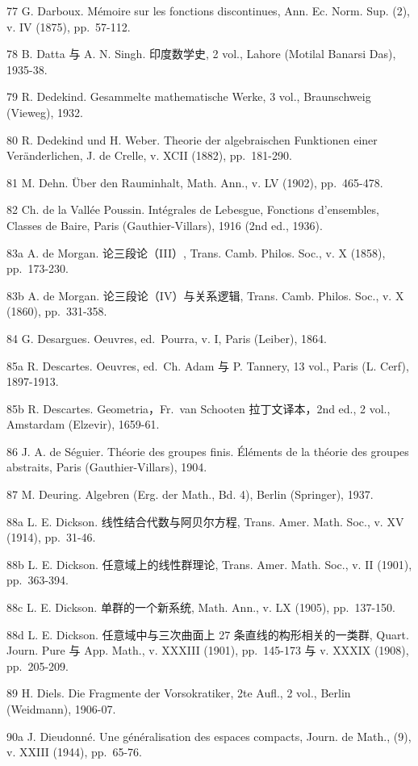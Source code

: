 77 G. Darboux. Mémoire sur les fonctions discontinues, Ann. Ec. Norm. Sup. (2), v. IV (1875), pp.~57-112.

78 B. Datta 与 A. N. Singh. 印度数学史, 2 vol., Lahore (Motilal Banarsi Das), 1935-38.

79 R. Dedekind. Gesammelte mathematische Werke, 3 vol., Braunschweig (Vieweg), 1932.

80 R. Dedekind und H. Weber. Theorie der algebraischen Funktionen einer Veränderlichen, J. de Crelle, v. XCII (1882), pp.~181-290.

81 M. Dehn. Über den Rauminhalt, Math. Ann., v. LV (1902), pp.~465-478.

82 Ch. de la Vallée Poussin. Intégrales de Lebesgue, Fonctions d'ensembles, Classes de Baire, Paris (Gauthier-Villars), 1916 (2nd ed., 1936).

83a A. de Morgan. 论三段论（III）, Trans. Camb. Philos. Soc., v. X (1858), pp.~173-230.

83b A. de Morgan. 论三段论（IV）与关系逻辑, Trans. Camb. Philos. Soc., v. X (1860), pp.~331-358.

84 G. Desargues. Oeuvres, ed.~Pourra, v. I, Paris (Leiber), 1864.

85a R. Descartes. Oeuvres, ed.~Ch. Adam 与 P. Tannery, 13 vol., Paris (L. Cerf), 1897-1913.

85b R. Descartes. Geometria，Fr.~van Schooten 拉丁文译本，2nd ed., 2 vol., Amstardam (Elzevir), 1659-61.

86 J. A. de Séguier. Théorie des groupes finis. Éléments de la théorie des groupes abstraits, Paris (Gauthier-Villars), 1904.

87 M. Deuring. Algebren (Erg. der Math., Bd. 4), Berlin (Springer), 1937.

88a L. E. Dickson. 线性结合代数与阿贝尔方程, Trans. Amer. Math. Soc., v. XV (1914), pp.~31-46.

88b L. E. Dickson. 任意域上的线性群理论, Trans. Amer. Math. Soc., v. II (1901), pp.~363-394.

88c L. E. Dickson. 单群的一个新系统, Math. Ann., v. LX (1905), pp.~137-150.

88d L. E. Dickson. 任意域中与三次曲面上 27 条直线的构形相关的一类群, Quart. Journ. Pure 与 App. Math., v. XXXIII (1901), pp.~145-173 与 v. XXXIX (1908), pp.~205-209.

89 H. Diels. Die Fragmente der Vorsokratiker, 2te Aufl., 2 vol., Berlin (Weidmann), 1906-07.

90a J. Dieudonné. Une généralisation des espaces compacts, Journ. de Math., (9), v. XXIII (1944), pp.~65-76.

